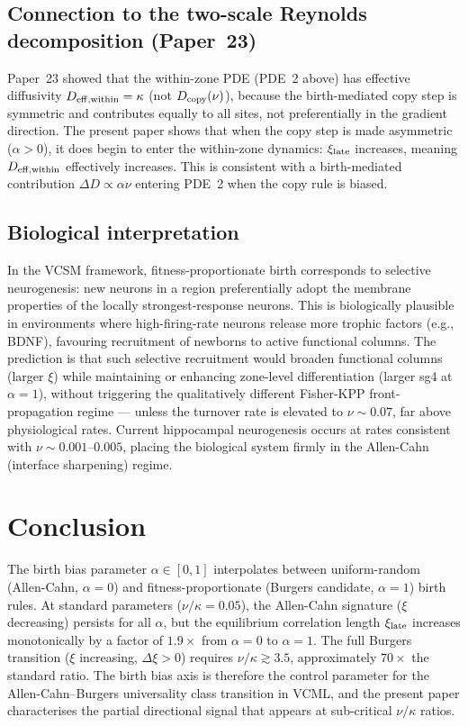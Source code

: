 \documentclass[11pt]{article}
\begin{document}
\subsection{Connection to the two-scale Reynolds decomposition (Paper~23)}

Paper~23 showed that the within-zone PDE (PDE~2 above) has effective
diffusivity $D_{\rm eff,within} = \kappa$ (not $D_{\rm copy}(\nu)$),
because the birth-mediated copy step is symmetric and contributes
equally to all sites, not preferentially in the gradient direction.
The present paper shows that when the copy step is made asymmetric
($\alpha > 0$), it does begin to enter the within-zone dynamics:
$\xi_{\rm late}$ increases, meaning $D_{\rm eff,within}$ effectively
increases.
This is consistent with a birth-mediated contribution $\Delta D \propto \alpha \nu$
entering PDE~2 when the copy rule is biased.

\subsection{Biological interpretation}

In the VCSM framework, fitness-proportionate birth corresponds to
selective neurogenesis: new neurons in a region preferentially adopt the
membrane properties of the locally strongest-response neurons.
This is biologically plausible in environments where high-firing-rate
neurons release more trophic factors (e.g., BDNF), favouring recruitment
of newborns to active functional columns.
The prediction is that such selective recruitment would broaden functional
columns (larger $\xi$) while maintaining or enhancing zone-level
differentiation (larger sg4 at $\alpha=1$), without triggering the
qualitatively different Fisher-KPP front-propagation regime --- unless
the turnover rate is elevated to $\nu \sim 0.07$, far above physiological
rates.
Current hippocampal neurogenesis occurs at rates consistent with
$\nu \sim 0.001$--$0.005$, placing the biological system firmly in the
Allen-Cahn (interface sharpening) regime.

\section{Conclusion}

The birth bias parameter $\alpha \in [0,1]$ interpolates between
uniform-random (Allen-Cahn, $\alpha=0$) and fitness-proportionate
(Burgers candidate, $\alpha=1$) birth rules.
At standard parameters ($\nu/\kappa = 0.05$), the Allen-Cahn signature
($\xi$ decreasing) persists for all $\alpha$, but the equilibrium
correlation length $\xi_{\rm late}$ increases monotonically by a factor
of $1.9\times$ from $\alpha=0$ to $\alpha=1$.
The full Burgers transition ($\xi$ increasing, $\Delta\xi > 0$) requires
$\nu/\kappa \gtrsim 3.5$, approximately $70\times$ the standard ratio.
The birth bias axis is therefore the control parameter for the
Allen-Cahn--Burgers universality class transition in VCML,
and the present paper characterises the partial directional signal that
appears at sub-critical $\nu/\kappa$ ratios.
\end{document}
